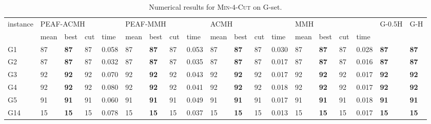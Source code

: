 \documentclass[12pt, a4paper]{article}%
\renewcommand{\arraystretch}{1.3}
\numberwithin{equation}{section}
\theoremstyle{plain}
\begin{document}
			
			{
				\scriptsize
				\setlength{\tabcolsep}{8.5pt}
				\renewcommand{\arraystretch}{1.2}
				\begin{landscape}
					\begin{longtable}{lllllllllllllllllll}
						\caption[Results for \textsc{Min}-$4$-\textsc{Cut}]{Numerical results for \textsc{Min}-$4$-\textsc{Cut} on G-set.}
						\label{tab::min4cut}\\
						\hline
						\multirow{2}{*}{instance} & \multicolumn{4}{l}{PEAF-ACMH}               & \multicolumn{4}{l}{PEAF-MMH}                & \multicolumn{4}{l}{ACMH}                   & \multicolumn{4}{l}{MMH}                    & \multirow{2}{*}{G-0.5H} & \multirow{2}{*}{G-H} \\ \cline{2-17}
						& mean    & best           & cut   & time      & mean    & best           & cut   & time     & mean    & best           & cut   & time      & mean    & best           & cut   & time     &                         &                      \\ \hline
						G1                        & 87   & \textbf{87} & 87  & 0.058 & 87   & \textbf{87} & 87  & 0.053 & 87   & \textbf{87} & 87  & 0.030 & 87   & \textbf{87} & 87  & 0.028 & \textbf{87}             & \textbf{87}          \\
						G2                        & 87   & \textbf{87} & 87  & 0.032 & 87   & \textbf{87} & 87  & 0.035 & 87   & \textbf{87} & 87  & 0.017 & 87   & \textbf{87} & 87  & 0.016 & \textbf{87}             & \textbf{87}          \\
						G3                        & 92   & \textbf{92} & 92  & 0.070 & 92   & \textbf{92} & 92  & 0.043 & 92   & \textbf{92} & 92  & 0.017 & 92   & \textbf{92} & 92  & 0.017 & \textbf{92}             & \textbf{92}          \\
						G4                        & 92   & \textbf{92} & 92  & 0.080 & 92   & \textbf{92} & 92  & 0.041 & 92   & \textbf{92} & 92  & 0.018 & 92   & \textbf{92} & 92  & 0.017 & \textbf{92}             & \textbf{92}          \\
						G5                        & 91   & \textbf{91} & 91  & 0.060 & 91   & \textbf{91} & 91  & 0.049 & 91   & \textbf{91} & 91  & 0.017 & 91   & \textbf{91} & 91  & 0.018 & \textbf{91}             & \textbf{91}          \\
						G14                       & 15   & \textbf{15} & 15  & 0.078 & 15   & \textbf{15} & 15  & 0.037 & 15   & \textbf{15} & 15  & 0.013 & 15   & \textbf{15} & 15  & 0.017 & \textbf{15}             & \textbf{15}          \\

\end{longtable}
\end{landscape}}
\end{document}
